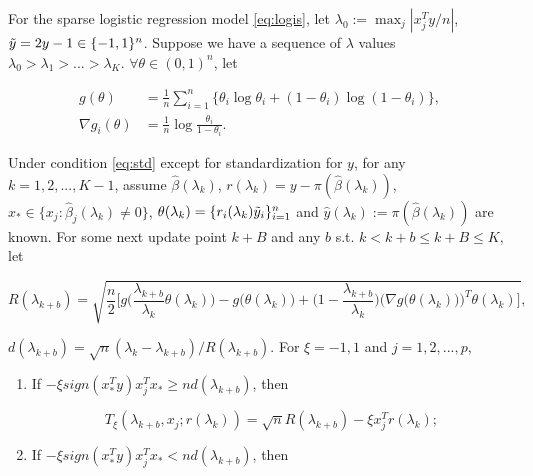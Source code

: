 \begin{theorem}
For the sparse logistic regression model \eqref{eq:logis}, let $\lambda_0:=\max_j|x_j^Ty/n|$, $\Tilde{y}=2y-1\in\{-1,1\}^n$. Suppose we have a sequence of $\lambda$ values $\lambda_0>\lambda_1>...>\lambda_K$. $\forall\theta\in(0,1)^n$, let 

\begin{equation}
    \begin{split}
        g(\theta)&=\frac{1}{n}\sum_{i=1}^n\{\theta_i\log \theta_i+(1-\theta_i)\log(1-\theta_i)\},\\
    \nabla g_i(\theta) &= \frac{1}{n}\log\frac{\theta_i}{1-\theta_i}.
    \end{split}
\end{equation}

Under condition \eqref{eq:std} except for standardization for $y$, for any $k=1,2,...,K-1$, assume $\hat{\beta}(\lambda_k)$, $r(\lambda_k)=y-\pi(\hat{\beta}(\lambda_k))$, $x_*\in\{x_j:\hat{\beta}_j(\lambda_k)\neq0\} $, $\theta(\lambda_k)=\{r_i(\lambda_k)\Tilde{y}_i\}_{i=1}^n$ and $\hat{y}(\lambda_k):=\pi(\hat{\beta}(\lambda_k))$ are known. For some next update point $k+B$ and any $b$ s.t. $k<k+b\leq k+B\leq K$, let

\begin{equation}
    R(\lambda_{k+b})=\sqrt{\frac{n}{2}\bigg[g\bigg(\frac{\lambda_{k+b}}{\lambda_k}\theta(\lambda_k)\bigg)-g\bigg(\theta(\lambda_k)\bigg)+\bigg(1-\frac{\lambda_{k+b}}{\lambda_k}\bigg)\bigg(\nabla g\big(\theta(\lambda_k)\big)\bigg)^T\theta(\lambda_k)\bigg]},
\end{equation}

$d(\lambda_{k+b})=\sqrt{n}(\lambda_k-\lambda_{k+b})/R(\lambda_{k+b})$. For $\xi = -1,1$ and $j=1,2,...,p$,

\begin{enumerate}
    \item If $-\xi sign(x_*^Ty)x_j^Tx_*\geq nd(\lambda_{k+b})$, then
    
    \begin{equation}
        T_\xi(\lambda_{k+b},x_j;r(\lambda_k))=\sqrt{n}R(\lambda_{k+b})-\xi x_j^Tr(\lambda_k);
    \end{equation}
    
    \item If $-\xi sign(x_*^Ty)x_j^Tx_*< nd(\lambda_{k+b})$, then
    

\end{enumerate}
\end{theorem}
